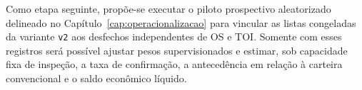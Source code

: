 Como etapa seguinte, propõe-se executar o piloto prospectivo aleatorizado delineado no Capítulo~\ref{cap:operacionalizacao} para vincular as listas congeladas da variante \texttt{v2} aos desfechos independentes de OS e TOI. Somente com esses registros será possível ajustar pesos supervisionados e estimar, sob capacidade fixa de inspeção, a taxa de confirmação, a antecedência em relação à carteira convencional e o saldo econômico líquido.
